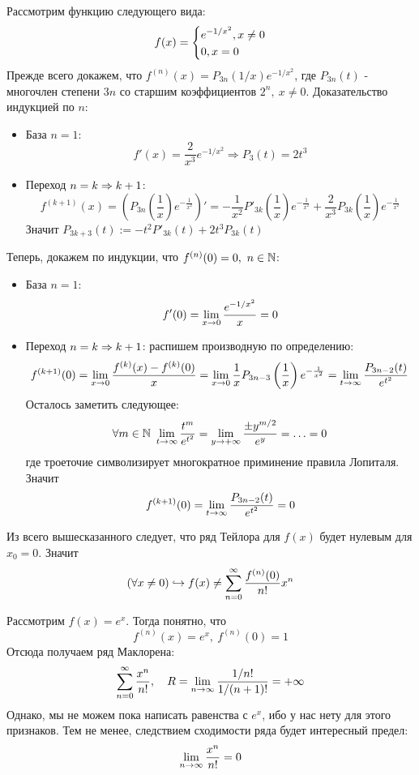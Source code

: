 \begin{example}
	Рассмотрим функцию следующего вида:
	\[
		f(x) = \left\{\begin{aligned}
			&{e^{-1/x^2}, x \neq 0}
			\\
			&{0, x = 0}
		\end{aligned}\right.
	\]
	Прежде всего докажем, что $f^{(n)}(x) = P_{3n}(1/x)e^{-1/x^2}$, где $P_{3n}(t)$ - многочлен степени $3n$ со старшим коэффициентов $2^n,\ x \neq 0$. Доказательство индукцией по $n$:
	\begin{itemize}
		\item База $n = 1$:
		\[
			f'(x) = \frac{2}{x^3} e^{-1/x^2} \Longrightarrow P_3(t) = 2t^3
		\]
		
		\item Переход $n = k \Rightarrow k + 1$:
		\[
			f^{(k + 1)}(x) = \left(P_{3n}\left(\frac{1}{x}\right)e^{-\frac{1}{x^2}}\right)' = -\frac{1}{x^2} P'_{3k}\left(\frac{1}{x}\right)e^{-\frac{1}{x^2}} + \frac{2}{x^3} P_{3k}\left(\frac{1}{x}\right)e^{-\frac{1}{x^2}}
		\]
		Значит $P_{3k + 3}(t) := -t^2 P'_{3k}(t) + 2t^3 P_{3k}(t)$
	\end{itemize}
	Теперь, докажем по индукции, что $f^{(n)}(0) = 0,\ n \in \mathbb{N}$:
	\begin{itemize}
		\item База $n = 1$:
		\[
			f'(0) = \lim\limits_{x \to 0} \frac{e^{-1/x^2}}{x} = 0
		\]
		
		\item Переход $n = k \Rightarrow k + 1$: распишем производную по определению:
		\[
			f^{(k + 1)}(0) = \lim\limits_{x \to 0} \frac{f^{(k)}(x) - f^{(k)}(0)}{x} = \lim\limits_{x \to 0} \frac{1}{x}P_{3n - 3}\left(\frac{1}{x}\right)e^{-\frac{1}{x^2}} = \lim\limits_{t \to \infty} \frac{P_{3n - 2}(t)}{e^{t^2}}
		\]
		Осталось заметить следующее:
		\[
			\forall m \in \N\ \liml_{t \to \infty} \frac{t^m}{e^{t^2}} = \liml_{y \to +\infty} \frac{\pm y^{m/2}}{e^y} = \ldots = 0
		\]
		где троеточие символизирует многократное приминение правила Лопиталя. Значит
		\[
			f^{(k + 1)}(0) = \lim\limits_{t \to \infty} \frac{P_{3n - 2}(t)}{e^{t^2}} = 0
		\]
	\end{itemize}
	Из всего вышесказанного следует, что ряд Тейлора для $f(x)$ будет нулевым для $x_0 = 0$. Значит
	\[
		(\forall x \neq 0) \hookrightarrow f(x) \neq \sum_{n = 0}^\infty \frac{f^{(n)}(0)}{n!}x^n
	\]
\end{example}

\begin{example}
	Рассмотрим $f(x) = e^x$. Тогда понятно, что
	\[
		f^{(n)}(x) = e^x,\ f^{(n)}(0) = 1
	\]
	Отсюда получаем ряд Маклорена:
	\[
		\sum_{n = 0}^\infty \frac{x^n}{n!}, \quad R = \lim\limits_{n \to \infty} \frac{1/n!}{1/(n + 1)!} = +\infty
	\]
	Однако, мы не можем пока написать равенства с $e^x$, ибо у нас нету для этого признаков. Тем не менее, следствием сходимости ряда будет интересный предел:
	\[
		\lim\limits_{n \to \infty} \frac{x^n}{n!} = 0
	\]
\end{example}

